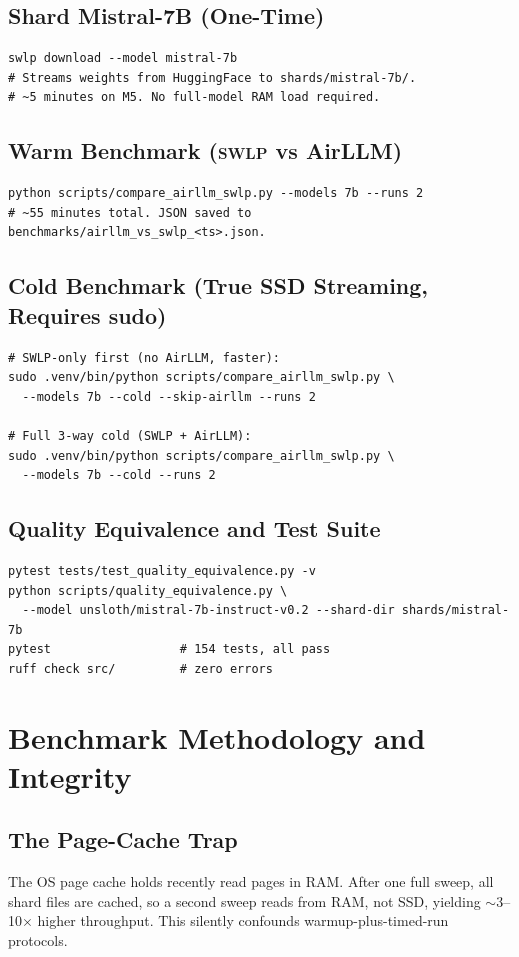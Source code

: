 \documentclass[10pt,a4paper]{article}
\newcommand{\swlp}{\textsc{swlp}}
\begin{document}
\subsection{Shard Mistral-7B (One-Time)}
\begin{lstlisting}
swlp download --model mistral-7b
# Streams weights from HuggingFace to shards/mistral-7b/.
# ~5 minutes on M5. No full-model RAM load required.
\end{lstlisting}

\subsection{Warm Benchmark (\swlp{} vs AirLLM)}
\begin{lstlisting}
python scripts/compare_airllm_swlp.py --models 7b --runs 2
# ~55 minutes total. JSON saved to benchmarks/airllm_vs_swlp_<ts>.json.
\end{lstlisting}

\subsection{Cold Benchmark (True SSD Streaming, Requires sudo)}
\begin{lstlisting}
# SWLP-only first (no AirLLM, faster):
sudo .venv/bin/python scripts/compare_airllm_swlp.py \
  --models 7b --cold --skip-airllm --runs 2

# Full 3-way cold (SWLP + AirLLM):
sudo .venv/bin/python scripts/compare_airllm_swlp.py \
  --models 7b --cold --runs 2
\end{lstlisting}

\subsection{Quality Equivalence and Test Suite}
\begin{lstlisting}
pytest tests/test_quality_equivalence.py -v
python scripts/quality_equivalence.py \
  --model unsloth/mistral-7b-instruct-v0.2 --shard-dir shards/mistral-7b
pytest                  # 154 tests, all pass
ruff check src/         # zero errors
\end{lstlisting}

\section{Benchmark Methodology and Integrity}
\label{app:methodology}

\subsection{The Page-Cache Trap}
The OS page cache holds recently read pages in RAM. After one full sweep, all
shard files are cached, so a second sweep reads from RAM, not SSD, yielding
$\sim$3--10$\times$ higher throughput. This silently confounds
warmup-plus-timed-run protocols.
\end{document}
